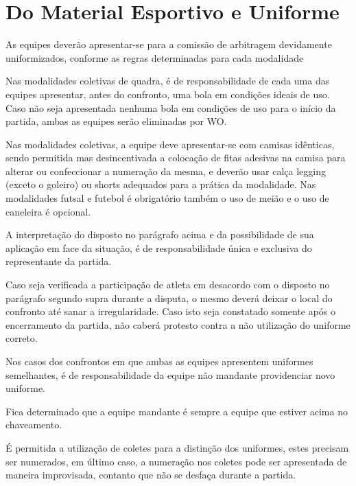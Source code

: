 {\let\clearpage\relax \chapter{Do Material Esportivo e Uniforme %
\label{chp:material}}}


\begin{article}
	As equipes deverão apresentar-se para a comissão de arbitragem devidamente uniformizados, conforme as regras determinadas para cada modalidade

	\begin{xparagraph}
		Nas modalidades coletivas de quadra, é de responsabilidade de cada uma das equipes apresentar, antes do confronto, uma bola em condições ideais de uso. Caso não seja apresentada nenhuma bola em condições de uso para o início da partida, ambas as equipes serão eliminadas por WO.
	\end{xparagraph}

	\begin{xparagraph}
		Nas modalidades coletivas, a equipe deve apresentar-se com camisas idênticas, sendo permitida mas desincentivada a colocação de fitas adesivas na camisa para alterar ou confeccionar a numeração da mesma, e deverão usar calça legging (exceto o goleiro) ou shorts adequados para a prática da modalidade. Nas modalidades futsal e futebol é obrigatório também o uso de meião e o uso de caneleira é opcional.
	\end{xparagraph}

	\begin{xparagraph}
		A interpretação do disposto no parágrafo acima e da possibilidade de sua aplicação em face da situação, é de responsabilidade única e exclusiva do representante da partida.
	\end{xparagraph}

	\begin{xparagraph}
		Caso seja verificada a participação de atleta em desacordo com o disposto no parágrafo segundo supra durante a disputa, o mesmo deverá deixar o local do confronto até sanar a irregularidade. Caso isto seja constatado somente após o encerramento da partida, não caberá protesto contra a não utilização do uniforme correto.
	\end{xparagraph}

	\begin{xparagraph}
		Nos casos dos confrontos em que ambas as equipes apresentem uniformes semelhantes, é de responsabilidade da equipe não mandante providenciar novo uniforme.
	\end{xparagraph}

	\begin{xparagraph}
		Fica determinado que a equipe mandante é sempre a equipe que estiver acima no chaveamento.
	\end{xparagraph}

	\begin{xparagraph}
		É permitida a utilização de coletes para a distinção dos uniformes, estes precisam ser numerados, em último caso, a numeração nos coletes pode ser apresentada de maneira improvisada, contanto que não se desfaça durante a partida.
	\end{xparagraph}
\end{article}
